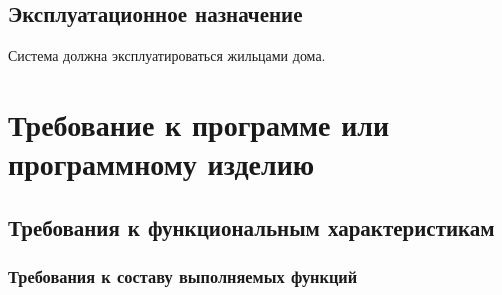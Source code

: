   \subsection{Эксплуатационное назначение}
  
    Система должна эксплуатироваться жильцами дома.
\section{Требование к программе или программному изделию}
  \subsection{Требования к функциональным характеристикам}
    \subsubsection{Требования к составу выполняемых функций}
    
